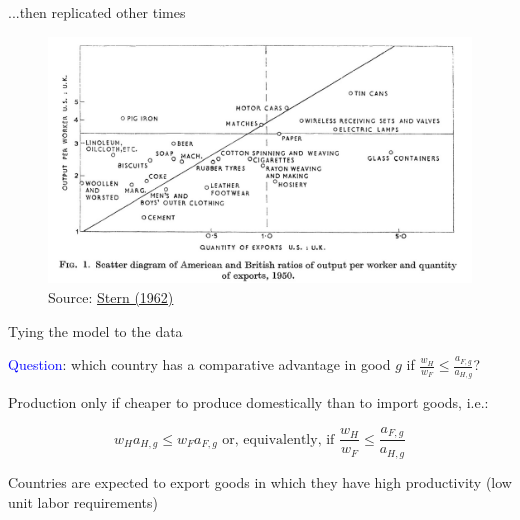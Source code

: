 \documentclass[notes,11pt, aspectratio=169, xcolor=table]{beamer}
\newcommand{\blue}[1]{\textcolor{blue}{#1}}
\newenvironment{wideitemize}{\itemize\addtolength{\itemsep}{10pt}}{\enditemize}
\begin{document}
\begin{frame}{...then replicated other times}
    \begin{figure}
        \centering
        \includegraphics[width=0.75\linewidth]{figs/stern1962.jpg}
        \caption{Source: \href{https://www.jstor.org/stable/2661740?seq=1}{Stern (1962)} }
        \label{fig:stern}
    \end{figure}
\end{frame}

\begin{frame}{Tying the model to the data}

\begin{wideitemize}
    \item<1-> \blue{Question}: which country has a comparative advantage in good $g$ if $\frac{w_H}{w_F} \le  \frac{a_{F,g}}{a_{H,g}}$?

    \item<2-> Production only if cheaper to produce domestically than to import goods, i.e.:

    \begin{equation*}
        w_H a_{H,g} \le w_F a_{F,g} \text{ or, equivalently, if } \frac{w_H}{w_F} \le  \frac{a_{F,g}}{a_{H,g}}
    \end{equation*}

    \item<3-> Countries are expected to export goods in which they have high productivity (low unit labor requirements)
\end{wideitemize}

    
\end{frame}
\end{document}
